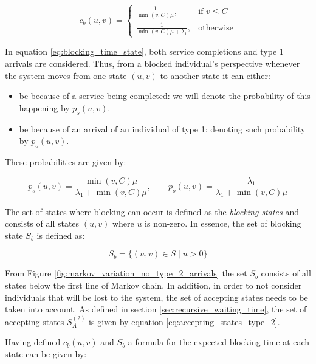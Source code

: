 \begin{equation}\label{eq:blocking_time_state}
    c_b(u,v) =
    \begin{cases}
        \frac{1}{\min(v,C) \mu}, & \text{if } v \leq C\\
        \frac{1}{\min(v,C) \mu + \lambda_1}, & \text{otherwise}
    \end{cases}
\end{equation}

In equation \ref{eq:blocking_time_state}, both service completions and
type 1 arrivals are considered.
Thus, from a blocked individual's perspective whenever the system moves from one
state \((u,v)\) to another state it can either:

\begin{itemize}
    \item be because of a service being completed: we will denote the
    probability of this happening by \(p_s(u,v)\).
    \item be because of an arrival of an individual of type 1: denoting such
    probability by \(p_o(u,v)\).
\end{itemize}

These probabilities are given by:

\begin{equation}\label{eq:blocking_time_probs}
    p_s(u,v) = \frac{\min(v,C)\mu}{\lambda_1 + \min(v,C)\mu}, \qquad
    p_o(u,v) = \frac{\lambda_1}{\lambda_1 + \min(v,C)\mu}
\end{equation}




The set of states where blocking can occur is defined as the \textit{blocking
states} and consists of all states \((u,v)\) where \(u\) is non-zero.
In essence, the set of blocking state \(S_b\) is defined as:

\begin{equation}\label{eq:blocking_states}
    S_b = \{(u,v) \in S \; | \; u > 0\}
\end{equation}

From Figure \ref{fig:markov_variation_no_type_2_arrivals} the set \(S_b\)
consists of all states below the first line of Markov chain.
In addition, in order to not consider individuals that will be lost to the
system, the set of accepting states needs to be taken into account.
As defined in section \ref{sec:recursive_waiting_time}, the set of accepting
states \(S_A^{(2)}\) is given by equation \ref{eq:accepting_states_type_2}.

Having defined \(c_b(u,v)\) and \(S_b\) a formula for the expected blocking time
at each state can be given by:

